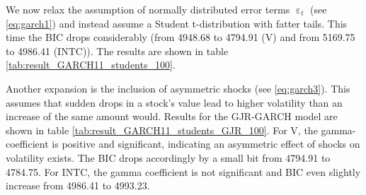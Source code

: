 \begin{table}[h!]
    \centering
    
    \caption{}
    \label{tab:INTC_result_GARCH11_100}
\end{table}{}

We now relax the assumption of normally distributed error terms $\upepsilon_t$ (see \ref{eq:garch1}) and instead assume a Student t-distribution with fatter tails. This time the BIC drops considerably (from 4948.68 to 4794.91 (V) and from 5169.75 to 4986.41 (INTC)). The results are shown in table \ref{tab:result_GARCH11_students_100}. 

\begin{table}[h!]
    \centering
    \vspace{-2ex}
    \small
    
    \vspace{1ex}
    \vspace{-2ex}
    \small
    
    \caption{}
    \label{tab:result_GARCH11_students_100}
\end{table}{}

Another expansion is the inclusion of asymmetric shocks (see \ref{eq:garch3}). This assumes that sudden drops in a stock's value lead to higher volatility than an increase of the same amount would. Results for the GJR-GARCH model are shown in table \ref{tab:result_GARCH11_students_GJR_100}. For V, the gamma-coefficient is positive and significant, indicating an asymmetric effect of shocks on volatility exists. The BIC drops accordingly by a small bit from 4794.91 to 4784.75. For INTC, the gamma coefficient is not significant and BIC even slightly increase from 4986.41 to 4993.23.

\begin{table}[h!]
    \centering
    \vspace{-2ex}
    \small
    
    \vspace{1ex}
    \vspace{-2ex}
    \small
    
    \caption{}
    \label{tab:result_GARCH11_students_GJR_100}
\end{table}{}

